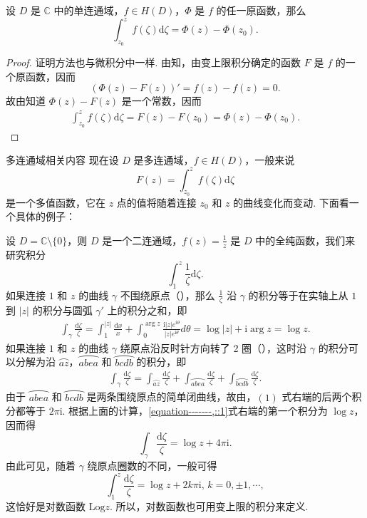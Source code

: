 \documentclass[../../main.tex]{subfiles}
\begin{document}
\begin{theorem}\label{theorem:复积分的微分学基本定理}
设 \( D \) 是 \( \mathbb{C} \) 中的单连通域，\( f \in H(D) \)，\( \Phi \) 是 \( f \) 的任一原函数，那么
\[
\int_{z_0}^{z} f(\zeta) \mathrm{d}\zeta  = \Phi(z) - \Phi(z_0).
\]
\end{theorem}
\begin{proof}
证明方法也与微积分中一样. 由知，由变上限积分确定的函数 \( F \) 是 \( f \) 的一个原函数，因而
\[
(\Phi(z) - F(z))' = f(z) - f(z) = 0.
\]
故由知道 \( \Phi(z) - F(z) \) 是一个常数，因而
\begin{align*}
\int_{z_0}^{z} f(\zeta) \mathrm{d}\zeta  = F(z) - F(z_0) = \Phi(z) - \Phi(z_0).
\end{align*}
\end{proof}

多连通域相关内容
现在设 \( D \) 是多连通域，\( f \in H(D) \)，一般来说
\[
F(z) = \int_{z_0}^{z} f(\zeta) \mathrm{d}\zeta 
\]
是一个多值函数，它在 \( z \) 点的值将随着连接 \( z_0 \) 和 \( z \) 的曲线变化而变动. 下面看一个具体的例子：

设 \( D = \mathbb{C} \setminus \{0\} \)，则 \( D \) 是一个二连通域，\( f(z) = \frac{1}{z} \) 是 \( D \) 中的全纯函数，我们来研究积分
\[
\int_{1}^{z} \frac{1}{\zeta} \mathrm{d}\zeta .
\]
如果连接 \( 1 \) 和 \( z \) 的曲线 \( \gamma \) 不围绕原点（），那么 \( \frac{1}{\zeta} \) 沿 \( \gamma \) 的积分等于在实轴上从 \( 1 \) 到 \( |z| \) 的积分与圆弧 \( \gamma' \) 上的积分之和，即
\begin{align*}
\int_{\gamma} \frac{\mathrm{d}\zeta }{\zeta} = \int_{1}^{|z|} \frac{\mathrm{d}x}{x} + \int_{0}^{\arg z} \frac{\mathrm{i}|z|e^{i\theta}}{|z|e^{\mathrm{i}\theta}} d\theta = \log|z| + \mathrm{i}\arg z = \log z.
\end{align*}
如果连接 \( 1 \) 和 \( z \) 的曲线 \( \gamma \) 绕原点沿反时针方向转了 2 圈（），这时沿 \( \gamma \) 的积分可以分解为沿 \( \wideparen{az} \)，\( \wideparen{abea} \) 和 \( \wideparen{bcdb} \) 的积分，即
\begin{align}
\int_{\gamma} \frac{\mathrm{d}\zeta }{\zeta} = \int_{\wideparen{az}} \frac{\mathrm{d}\zeta }{\zeta} + \int_{\wideparen{abea}} \frac{\mathrm{d}\zeta }{\zeta} + \int_{\wideparen{bcdb}} \frac{\mathrm{d}\zeta }{\zeta}. \label{equation-------,::1}
\end{align}
由于 \( \wideparen{abea} \) 和 \( \wideparen{bcdb} \) 是两条围绕原点的简单闭曲线，故由，\((1)\) 式右端的后两个积分都等于 \( 2\pi \mathrm{i} \). 根据上面的计算，\eqref{equation-------,::1}式右端的第一个积分为 \( \log z \)，因而得
\[
\int_{\gamma} \frac{\mathrm{d}\zeta }{\zeta} = \log z + 4\pi \mathrm{i}.
\]
由此可见，随着 \( \gamma \) 绕原点圈数的不同，一般可得
\[
\int_{1}^{z} \frac{\mathrm{d}\zeta }{\zeta} = \log z + 2k\pi \mathrm{i}, \, k = 0, \pm 1, \cdots,
\]
这恰好是对数函数 \( \text{Log} z \). 所以，对数函数也可用变上限的积分来定义. 
\end{document}
